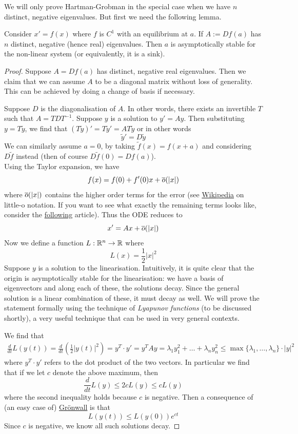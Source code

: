 We will only prove Hartman-Grobman in the special case when we have $n$ distinct, negative eigenvalues. But first we need the following lemma.
\begin{lemma} \label{lem:sink-solns}
Consider $x' = f(x)$ where $f$ is $C^1$ with an equilibrium at $a$. If $A := Df(a)$ has $n$ distinct, negative (hence real) eigenvalues. Then $a$ is asymptotically stable for the non-linear system (or equivalently, it is a sink).
\end{lemma}
\begin{proof}
Suppose $A = Df(a)$ has distinct, negative real eigenvalues. Then we claim that we can assume $A$ to be a diagonal matrix without loss of generality. This can be achieved by doing a change of basis if necessary. 

Suppose $D$ is the diagonalisation of $A$. In other words, there exists an invertible $T$ such that $A = T D T^{-1}$. Suppose $y$ is a solution to $y' = A y$. Then substituting $y = T \tilde{y}$, we find that $ (T \tilde{y})' = T \tilde{y}' = A T \tilde{y}$ or in other words $$\tilde{y}' = D \tilde{y}$$
We can similarly assume $a = 0$, by taking $\tilde{f}(x) = f(x + a)$ and considering $D \tilde{f}$ instead (then of course $D \tilde{f}(0) = Df(a)$).\\ 

Using the Taylor expansion, we have
$$ f(x) = f(0) + f'(0)x + \overline{o}(\left| x \right|) $$
where $\overline{o}(\left| x \right|)$ contains the higher order terms for the error (see \href{https://en.wikipedia.org/wiki/Big_O_notation#Little-o_notation}{Wikipedia} on little-o notation. If you want to see what exactly the remaining terms looks like, consider the \href{https://en.wikipedia.org/wiki/Taylor_series#Taylor_series_in_several_variables}{following} article). Thus the ODE reduces to
$$ x' = Ax + \overline{o}(\left| x \right|) $$
Now we define a function $L: \mathbb{R}^n \to \mathbb{R}$ where
$$ L(x) = \frac{1}{2}\left| x \right|^2 $$
Suppose $y$ is a solution to the linearisation. Intuitively, it is quite clear that the origin is asymptotically stable for the linearisation: we have a basis of eigenvectors and along each of these, the solutions decay. Since the general solution is a linear combination of these, it must decay as well. We will prove the statement formally using the technique of \textit{Lyapunov functions} (to be discussed shortly), a very useful technique that can be used in very general contexts.

We find that
\begin{align*}
    \frac{d}{dt} L(y(t)) = \frac{d}{dt} \left( \frac{1}{2} \left| y(t) \right|^2 \right) = y^{T} \cdot y' = y^{T} Ay = \lambda_1 y_1^2 + \dots + \lambda_n y_n^2 \leq \max\{ \lambda_1, \dots, \lambda_n \} \cdot |y|^2
\end{align*}
where $y^{T} \cdot y'$ refers to the dot product of the two vectors. In particular we find that if we let $c$ denote the above maximum, then
$$ \frac{d}{dt} L(y) \leq 2 c L(y) \leq c L(y) $$
where the second inequality holds because $c$ is negative. Then a consequence of (an easy case of) \hyperref[thm:easy-gronwall]{Grönwall} is that
$$ L(y(t)) \leq L(y(0)) e^{ct} $$
Since $c$ is negative, we know all such solutions decay.


\end{proof}
